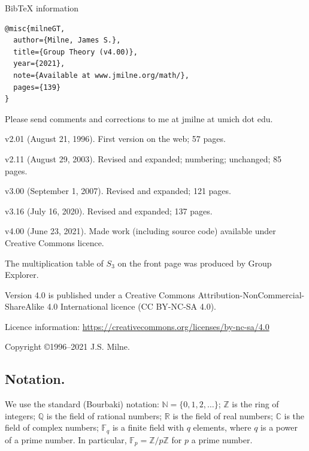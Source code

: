 \documentclass[a4paper,11pt,final]{memoir}%
\theoremstyle{nonumberplain}
\begin{document}
\vfill \noindent BibTeX information
\begin{verbatim}
@misc{milneGT,
  author={Milne, James S.},
  title={Group Theory (v4.00)},
  year={2021},
  note={Available at www.jmilne.org/math/},
  pages={139}
}
\end{verbatim}

\vfill


\noindent Please send comments and corrections to me at jmilne at umich dot edu.

\noindent v2.01 (August 21, 1996). First version on the web; 57 pages.

\noindent v2.11 (August 29, 2003). Revised and expanded; numbering; unchanged; 85 pages.

\noindent v3.00 (September 1, 2007). Revised and expanded; 121 pages.

\noindent v3.16 (July 16, 2020). Revised and expanded; 137 pages.

\noindent v4.00 (June 23, 2021). Made work (including source code) available 
under Creative Commons licence.
\vfill


\noindent The multiplication table of $S_{3}$ on the front page was produced
by Group Explorer. \vfill

\noindent Version 4.0 is published under a Creative Commons
Attribution-NonCommercial-ShareAlike 4.0 International licence 
(CC BY-NC-SA 4.0).

\bigskip

\noindent Licence information: 
\href{https://creativecommons.org/licenses/by-nc-sa/4.0/}{https://creativecommons.org/licenses/by-nc-sa/4.0}

\bigskip

\noindent Copyright \copyright 1996--2021 J.S. Milne.




\setcounter{page}{2} 
\clearpage\pagestyle{plain} 
\vspace*{-0.5in}\tableoc


\clearpage


\subsection{Notation.}

We use the standard (Bourbaki) notation: $\mathbb{N}=\{0,1,2,\ldots\}$;
$\mathbb{Z}$ is the ring of integers; $\mathbb{Q}{}$ is the field of rational
numbers; $\mathbb{R}{}$ is the field of real numbers; $\mathbb{C}{}$ is the
field of complex numbers; $\mathbb{F}_{q}$ is a finite field with $q$
elements, where $q$ is a power of a prime number. In particular,
$\mathbb{F}_{p}=\mathbb{Z}{}/p\mathbb{Z}{}$ for $p$ a prime number.
\end{document}
